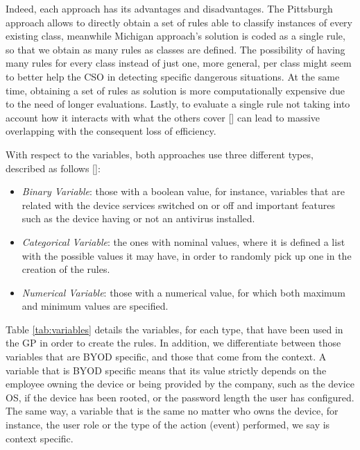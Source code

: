 Indeed, each approach has its advantages and disadvantages. The Pittsburgh approach allows to directly obtain a set of rules able to classify instances of every existing class, meanwhile Michigan approach's solution is coded as a single rule, so that we obtain as many rules as classes are defined. The possibility of having many rules for every class instead of just one, more general, per class might seem to better help the CSO in detecting specific dangerous situations.
At the same time, obtaining a set of rules as solution is more
computationally expensive due to the need of longer
evaluations. Lastly, to evaluate a single rule not taking into account
how it interacts with what the others cover [\cite{freitas2002data}]
can lead to massive overlapping with the consequent loss of
efficiency. 

With respect to the variables, both approaches use three different types, 
described as follows [\cite{witten2005data}]:

\begin{itemize}
\item {\em Binary Variable}: those with a boolean value, for instance, variables that are related with the device services switched on or off and important features such as the device having or not an antivirus installed. 
\item {\em Categorical Variable}: the ones with nominal values, where it is defined a list with the possible values it may have, in order to randomly pick up one in the creation of the rules. 
\item {\em Numerical Variable}: those with a numerical value, for which both maximum and minimum values are specified. 

\end{itemize}

Table \ref{tab:variables} details the variables, for each type, that have been used in the GP in order to create the rules. In addition, we differentiate between those variables that are BYOD specific, and those that come from the context. A variable that is BYOD specific means that its value strictly depends on the employee owning the device or being provided by the company, such as the device OS, if the device has been rooted, or the password length the user has configured. The same way, a variable that is the same no matter who owns the device, for instance, the user role or the type of the action (event) performed, we say is context specific.


